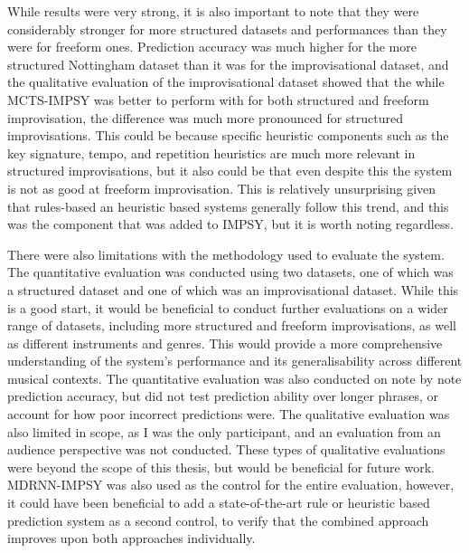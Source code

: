 While results were very strong, it is also important to note that they were considerably stronger for more structured datasets and performances than they were for freeform ones. Prediction accuracy was much higher for the more structured Nottingham dataset than it was for the improvisational dataset, and the qualitative evaluation of the improvisational dataset showed that the while MCTS-IMPSY was better to perform with for both structured and freeform improvisation, the difference was much more pronounced for structured improvisations. This could be because specific heuristic components such as the key signature, tempo, and repetition heuristics are much more relevant in structured improvisations, but it also could be that even despite this the system is not as good at freeform improvisation. This is relatively unsurprising given that rules-based an heuristic based systems generally follow this trend, and this was the component that was added to IMPSY, but it is worth noting regardless.

There were also limitations with the methodology used to evaluate the system. The quantitative evaluation was conducted using two datasets, one of which was a structured dataset and one of which was an improvisational dataset. While this is a good start, it would be beneficial to conduct further evaluations on a wider range of datasets, including more structured and freeform improvisations, as well as different instruments and genres. This would provide a more comprehensive understanding of the system's performance and its generalisability across different musical contexts. The quantitative evaluation was also conducted on note by note prediction accuracy, but did not test prediction ability over longer phrases, or account for how poor incorrect predictions were. The qualitative evaluation was also limited in scope, as I was the only participant, and an evaluation from an audience perspective was not conducted. These types of qualitative evaluations were beyond the scope of this thesis, but would be beneficial for future work. MDRNN-IMPSY was also used as the control for the entire evaluation, however, it could have been beneficial to add a state-of-the-art rule or heuristic based prediction system as a second control, to verify that the combined approach improves upon both approaches individually.

